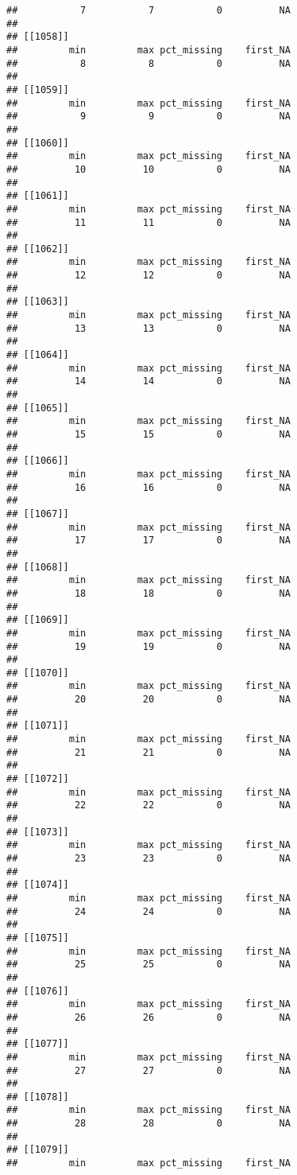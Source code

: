 \documentclass[
]{article}
\begin{document}
\begin{verbatim}
##           7           7           0          NA 
## 
## [[1058]]
##         min         max pct_missing    first_NA 
##           8           8           0          NA 
## 
## [[1059]]
##         min         max pct_missing    first_NA 
##           9           9           0          NA 
## 
## [[1060]]
##         min         max pct_missing    first_NA 
##          10          10           0          NA 
## 
## [[1061]]
##         min         max pct_missing    first_NA 
##          11          11           0          NA 
## 
## [[1062]]
##         min         max pct_missing    first_NA 
##          12          12           0          NA 
## 
## [[1063]]
##         min         max pct_missing    first_NA 
##          13          13           0          NA 
## 
## [[1064]]
##         min         max pct_missing    first_NA 
##          14          14           0          NA 
## 
## [[1065]]
##         min         max pct_missing    first_NA 
##          15          15           0          NA 
## 
## [[1066]]
##         min         max pct_missing    first_NA 
##          16          16           0          NA 
## 
## [[1067]]
##         min         max pct_missing    first_NA 
##          17          17           0          NA 
## 
## [[1068]]
##         min         max pct_missing    first_NA 
##          18          18           0          NA 
## 
## [[1069]]
##         min         max pct_missing    first_NA 
##          19          19           0          NA 
## 
## [[1070]]
##         min         max pct_missing    first_NA 
##          20          20           0          NA 
## 
## [[1071]]
##         min         max pct_missing    first_NA 
##          21          21           0          NA 
## 
## [[1072]]
##         min         max pct_missing    first_NA 
##          22          22           0          NA 
## 
## [[1073]]
##         min         max pct_missing    first_NA 
##          23          23           0          NA 
## 
## [[1074]]
##         min         max pct_missing    first_NA 
##          24          24           0          NA 
## 
## [[1075]]
##         min         max pct_missing    first_NA 
##          25          25           0          NA 
## 
## [[1076]]
##         min         max pct_missing    first_NA 
##          26          26           0          NA 
## 
## [[1077]]
##         min         max pct_missing    first_NA 
##          27          27           0          NA 
## 
## [[1078]]
##         min         max pct_missing    first_NA 
##          28          28           0          NA 
## 
## [[1079]]
##         min         max pct_missing    first_NA 

\end{verbatim}
\end{document}
